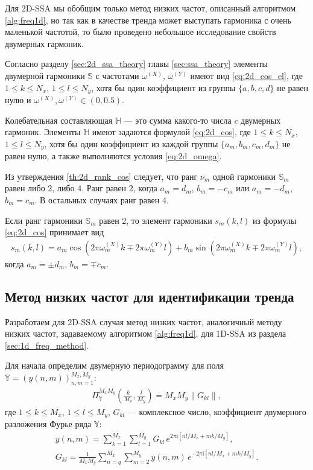 \documentclass[specialist,
               substylefile = spbu.rtx,
               subf,href,colorlinks=true, 12pt]{disser}
\newcommand{\I}{\mathrm{i}}
\begin{document}
Для 2D-SSA мы обобщим только метод низких частот, описанный алгоритмом \ref{alg:freq1d}, но так как в качестве тренда может выступать гармоника с очень маленькой частотой, то было проведено небольшое исследование свойств двумерных гармоник.

Согласно разделу \ref{sec:2d_ssa_theory} главы \ref{sec:ssa_theory} элементы двумерной гармоники $\mathbb{S}$ с частотами $\omega^{(X)}$, $\omega^{(Y)}$ имеют вид \eqref{eq:2d_cos_el},
где $1 \leqslant k \leqslant N_x$, $1 \leqslant l \leqslant N_y$, хотя бы один коэффициент из  группы $\{a,b,c,d\}$ не равен нулю и
$\omega^{(X)}, \omega^{(Y)} \in (0,0.5)$.

Колебательная составляющая  $\mathbb{H}$ --- это сумма какого-то числа $c$ двумерных гармоник. Элементы $\mathbb{H}$ имеют задаются формулой \eqref{eq:2d_cos},
где $1 \leqslant k \leqslant N_x$, $1 \leqslant l \leqslant N_y$, хотя бы один коэффициент из каждой группы $\{a_m,b_m,c_m,d_m\}$ не равен нулю, а также выполняются условия \eqref{eq:2d_omega}.

Из утверждения \ref{th:2d_rank_cos} следует, что ранг $\nu_m$ одной гармоники $\mathbb{S}_m$ равен либо 2, либо 4. Ранг равен 2, когда $a_m = d_m$, $b_m = -c_m$ или $a_m = -d_m$, $b_m = c_m$. В остальных случаях ранг равен 4.

Если ранг гармоники $\mathbb{S}_m$ равен 2, то элемент гармоники $s_m(k,l)$ из формулы \eqref{eq:2d_cos} принимает вид
\begin{gather} \label{eq:2d_cos_rank2}
s_m(k,l)=a_m \cos(2\pi \omega_m^{(X)}k \mp 2\pi \omega_m^{(Y)}l) + b_m \sin(2\pi \omega_m^{(X)}k \mp 2\pi \omega_m^{(Y)}l),
\end{gather}
когда $a_m = \pm d_m$, $b_m = \mp c_m$.


\subsection{Метод низких частот для идентификации тренда}
\label{sec:freq_method_2d}

Разработаем для 2D-SSA случая метод низких частот, аналогичный методу низких частот, задаваемому алгоритмом \ref{alg:freq1d}, для 1D-SSA из раздела \ref{sec:1d_freq_method}.

Для начала определим двумерную периодограмму для поля $\mathbb{Y}=\left(y(n,m)\right)_{n,m=1}^{M_x, M_y}$:
\begin{gather*}
 \Pi_\mathbb{Y}^{M_x M_y} \left(\frac{k}{M_x}, \frac{l}{M_y}\right) = M_x M_y \|G_{kl}\|,
\end{gather*}
где $1 \leqslant k \leqslant M_x$, $1 \leqslant l \leqslant M_y$, $G_{kl}$ --- комплексное число, коэффициент двумерного разложения Фурье ряда $\mathbb{Y}$:
\begin{gather*}
y(n,m)=\sum_{k=1}^{M_x}\sum_{l=1}^{M_y} G_{kl}\, e^{2\pi\I \left[nl/M_x + mk/M_y\right]}, \\
 G_{kl}= \frac{1}{M_x M_y} \sum_{n=q}^{M_x}\sum_{m=2}^{M_y} y(n,m)\, e^{-2\pi\I \left[nl/M_x + mk/M_y\right]}.
\end{gather*}
\end{document}
